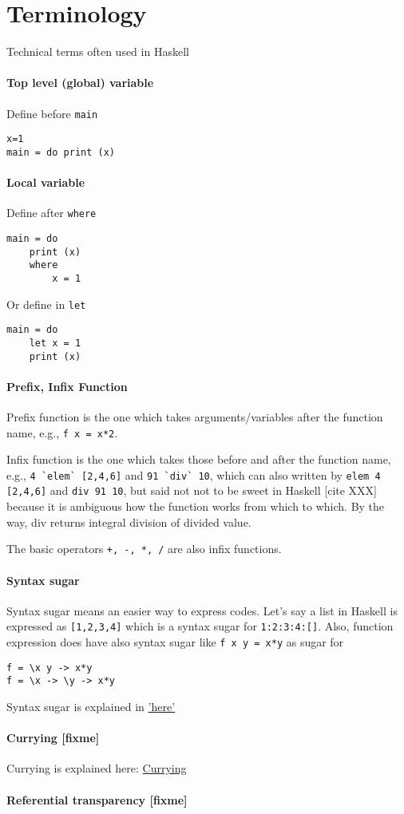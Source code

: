 \section{Terminology}
Technical terms often used in Haskell

\paragraph{Top level (global) variable}
Define before \lstinline{main}

\begin{lstlisting}
x=1
main = do print (x) 
\end{lstlisting}

\paragraph{Local variable}
Define after \lstinline{where}
\begin{lstlisting}
main = do 
    print (x)
    where 
        x = 1
\end{lstlisting}

Or define in \lstinline{let}
\begin{lstlisting}
main = do
    let x = 1 
    print (x)
\end{lstlisting}

\paragraph{Prefix, Infix Function} 
Prefix function is the one which takes arguments/variables after the function name, 
e.g., \lstinline{f x = x*2}. 

Infix function is the one which takes those before and after the function name, 
e.g.,  \lstinline{4 `elem` [2,4,6]} and \lstinline{91 `div` 10}, which can also written by \lstinline{elem 4 [2,4,6]}  and \lstinline{div 91 10}, 
but said not not to be sweet in Haskell [cite XXX] because it is ambiguous how the function works from which to which. 
By the way, div returns integral division of divided value. 

The basic operators  \lstinline{+, -, *, /} are also infix functions.

\paragraph{Syntax sugar}
Syntax sugar means an easier way to express codes. Let’s say a list in Haskell is expressed as  
\lstinline{[1,2,3,4]} which is a syntax sugar for \lstinline{1:2:3:4:[]}. Also, function expression does have also syntax sugar like \lstinline{f x y = x*y} as sugar for 
\begin{lstlisting}
f = \x y -> x*y
f = \x -> \y -> x*y
\end{lstlisting}

Syntax sugar is explained in  \href{https://en.wikibooks.org/wiki/Haskell/Syntactic_sugar#Function_Bindings}{'here'}
\paragraph{Currying [fixme]}

Currying is explained here:
\href{https://wiki.haskell.org/Currying}{Currying}

\paragraph{Referential transparency [fixme]}
